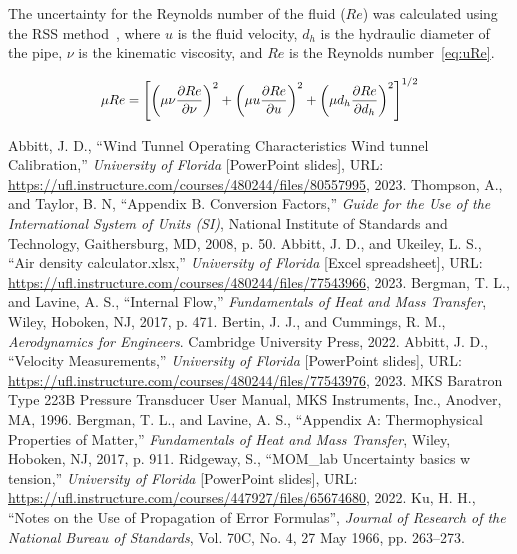 \documentclass[journal,letterpaper]{IEEEtran}
\begin{document}
The uncertainty for the Reynolds number of the fluid ($Re$) was calculated using the RSS method~\cite{MoMLecture}, where $u$ is the fluid velocity, $d_h$ is the hydraulic diameter of the pipe, $\nu$ is the kinematic viscosity, and $Re$ is the Reynolds number~\eqref{eq:uRe}.

\begin{equation} \label{eq:uRe}
    \resizebox{227pt}{!}{$\displaystyle{\mu Re = \left[\left(\mu \nu \frac{\partial Re}{\partial \nu}\right)^2 + \left(\mu u \frac{\partial Re}{\partial u}\right)^2 + \left(\mu d_h \frac{\partial Re}{\partial d_h}\right)^2\right]^{1/2}}$}
\end{equation}

\begin{thebibliography}{99}
     Abbitt, J. D., ``Wind Tunnel Operating Characteristics
    Wind tunnel Calibration,'' \textit{University of Florida} [PowerPoint slides], URL: \url{https://ufl.instructure.com/courses/480244/files/80557995}, 2023.
     Thompson, A., and Taylor, B. N, ``Appendix B. Conversion Factors,'' \textit{Guide for the Use of the International System of Units (SI)}, National Institute of Standards and Technology, Gaithersburg, MD, 2008, p. 50.
     Abbitt, J. D., and Ukeiley, L. S., ``Air density calculator.xlsx,'' \textit{University of Florida} [Excel spreadsheet], URL: \url{https://ufl.instructure.com/courses/480244/files/77543966}, 2023.
     Bergman, T. L., and Lavine, A. S., ``Internal Flow,'' \textit{Fundamentals of Heat and Mass Transfer}, Wiley, Hoboken, NJ, 2017, p. 471.
     Bertin, J. J., and Cummings, R. M., \textit{Aerodynamics for Engineers}. Cambridge University Press, 2022.
     Abbitt, J. D., ``Velocity Measurements,'' \textit{University of Florida} [PowerPoint slides], URL: \url{https://ufl.instructure.com/courses/480244/files/77543976}, 2023.
     MKS Baratron Type 223B Pressure Transducer User Manual, MKS Instruments, Inc., Anodver, MA, 1996.
     Bergman, T. L., and Lavine, A. S., ``Appendix A: Thermophysical Properties of Matter,'' \textit{Fundamentals of Heat and Mass Transfer}, Wiley, Hoboken, NJ, 2017, p. 911.
     Ridgeway, S., ``MOM\_lab Uncertainty basics w tension,'' \textit{University of Florida} [PowerPoint slides], URL: \url{https://ufl.instructure.com/courses/447927/files/65674680}, 2022.
     Ku, H. H., ``Notes on the Use of Propagation of Error Formulas'', \textit{Journal of Research of the National Bureau of Standards}, Vol. 70C, No. 4, 27 May 1966, pp. 263--273.
\end{thebibliography}
\end{document}
